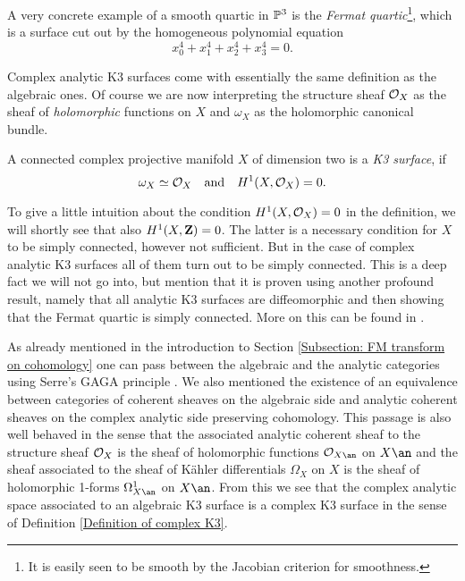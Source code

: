 \begin{example}        
    A very concrete example of a smooth quartic in $\mathbb P^3$ is the \emph{Fermat quartic}\footnote{It is easily seen to be smooth by the Jacobian criterion for smoothness.}, which is a surface cut out by the homogeneous polynomial equation 
    \[
        x_0^4 + x_1^4 + x_2^4 + x_3^4 = 0.
    \]
\end{example}

Complex analytic K3 surfaces come with essentially the same definition as the algebraic ones. Of course we are now interpreting the structure sheaf ${\mathcal{O}_{X}}$ as the sheaf of \emph{holomorphic} functions on $X$ and $\omega_X$ as the holomorphic canonical bundle.  

\begin{definition}
    \label{Definition of complex K3}
    A connected complex projective manifold $X$ of dimension two is a \emph{K3 surface}, if  
     \[
        \omega_X \simeq {\mathcal{O}_{X}} \quad \text{and} \quad H^{1}(X, {\mathcal{O}_{X}}) = 0.
    \]
\end{definition}

\begin{remark}
    To give a little intuition about the condition $H^{1}(X, {\mathcal{O}_{X}}) = 0$ in the definition, we will shortly see that also $H^{1}(X, \mathbf Z) = 0$. The latter is a necessary condition for $X$ to be simply connected, however not sufficient. But in the case of complex analytic K3 surfaces all of them turn out to be simply connected. This is a deep fact we will not go into, but mention that it is proven using another profound result, namely that all analytic K3 surfaces are diffeomorphic and then showing that the Fermat quartic is simply connected. More on this can be found in \cite[\S 7.1]{Huybrechts2016}.
\end{remark}

As already mentioned in the introduction to Section \ref{Subsection: FM transform on cohomology} one can pass between the algebraic and the analytic categories using Serre's GAGA principle \cite{Serre1956}. We also mentioned the existence of an equivalence between categories of coherent sheaves on the algebraic side and analytic coherent sheaves on the complex analytic side preserving cohomology. This passage is also well behaved in the sense that the associated analytic coherent sheaf to the structure sheaf ${\mathcal{O}_{X}}$ is the sheaf of holomorphic functions $\struct{X\an}$ on $X\an$ and the sheaf associated to the sheaf of Kähler differentials $\Omega_X$ on $X$ is the sheaf of holomorphic 1-forms $\Omega^1_{X\an}$ on $X\an$. From this we see that the complex analytic space associated to an algebraic K3 surface is a complex K3 surface in the sense of Definition \ref{Definition of complex K3}.

